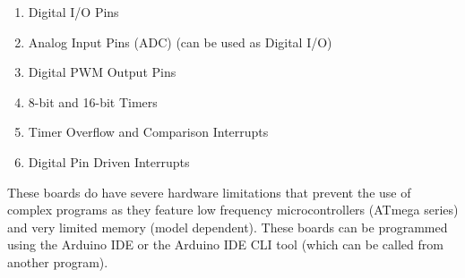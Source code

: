 \documentclass[../main.tex]{subfiles}
\begin{document}
\begin{enumerate}
\item Digital I/O Pins
\item Analog Input Pins (ADC) (can be used as Digital I/O)
\item Digital PWM Output Pins
\item 8-bit and 16-bit Timers
\item Timer Overflow and Comparison Interrupts
\item Digital Pin Driven Interrupts
\end{enumerate}

These boards do have severe hardware limitations that prevent the use of complex programs as they feature low frequency microcontrollers (ATmega series) and very limited memory (model dependent). These boards can be programmed using the Arduino IDE or the Arduino IDE CLI tool (which can be called from another program)\cite{arduino_ide}.
\end{document}
